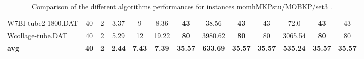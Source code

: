 \begin{table}[h]
{\begin{tabular}{lcccccccccccc}
W7BI-tube2-1800.DAT & 40 & 2 &  \textcolor{blue2}{3.37} & 9 & 8.36 &  \textbf{43} & 38.56 &  \textbf{43} & 43 & 72.0 &  \textbf{43} & 43 \\
Wcollage-tube.DAT & 40 & 2 &  \textcolor{blue2}{5.29} & 12 & 19.22 &  \textbf{80} & 3980.62 &  \textbf{80} & 80 & 3065.54 &  \textbf{80} & 80 \\
\cline{1-13} \textbf{avg} & \textbf{40} & \textbf{2} & \textbf{2.44} & \textbf{7.43} & \textbf{7.39} & \textbf{35.57} & \textbf{633.69} & \textbf{35.57} & \textbf{35.57} & \textbf{535.24} & \textbf{35.57} & \textbf{35.57} \\ \cline{1-13}
\bottomrule
\end{tabular}
}%
\caption{Comparison of the different algorithms performances for instances momhMKPstu/MOBKP/set3 .}
\label{tab:table_compare_momhMKPstu/MOBKP/set3 }
\end{table}
